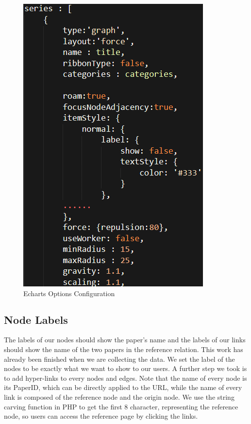 \documentclass{book}
\begin{document}
\begin{figure}[htp]
\centering
\includegraphics[scale=0.55]{img/zlt_rel_code_config.png}
\caption{Echarts Options Configuration}
\label{fig:rel_codess}
\end{figure}

\subsection{Node Labels}

The labels of our nodes should show the paper's name and the labels of our links should show the name of the two papers in the reference relation. This work has already been finished when we are collecting the data. We set the label of the nodes to be exactly what we want to show to our users. A further step we took is to add hyper-links to every nodes and edges. Note that the name of every node is its PaperID, which can be directly applied to the URL, while the name of every link is composed of the reference node and the origin node. We use the string carving function in PHP to get the first 8 character, representing the reference node, so users can access the reference page by clicking the links.
\end{document}
